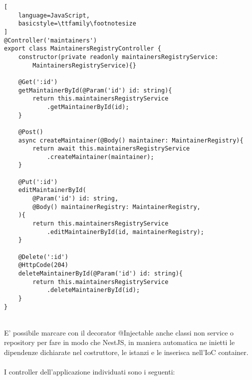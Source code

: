 \begin{lstlisting}[
    language=JavaScript,
    basicstyle=\ttfamily\footnotesize
]
@Controller('maintainers')
export class MaintainersRegistryController {
    constructor(private readonly maintainersRegistryService: 
        MaintainersRegistryService){}

    @Get(':id')
    getMaintainerById(@Param('id') id: string){
        return this.maintainersRegistryService
            .getMaintainerById(id);
    }

    @Post()
    async createMaintainer(@Body() maintainer: MaintainerRegistry){
        return await this.maintainersRegistryService
            .createMaintainer(maintainer);
    }

    @Put(':id')
    editMaintainerById(
        @Param('id') id: string,
        @Body() maintainerRegistry: MaintainerRegistry,
    ){
        return this.maintainersRegistryService
            .editMaintainerById(id, maintainerRegistry);
    }

    @Delete(':id')
    @HttpCode(204)
    deleteMaintainerById(@Param('id') id: string){
        return this.maintainersRegistryService
            .deleteMaintainerById(id);
    }
}
\end{lstlisting}
\leavevmode\newline
\\
E' possibile marcare con il decorator @Injectable
anche classi non service o repository per fare in modo che NestJS, in maniera automatica ne inietti le dipendenze 
dichiarate nel costruttore, le istanzi e le inserisca nell'IoC container.
\\\\
I controller dell'applicazione individuati sono i seguenti:
